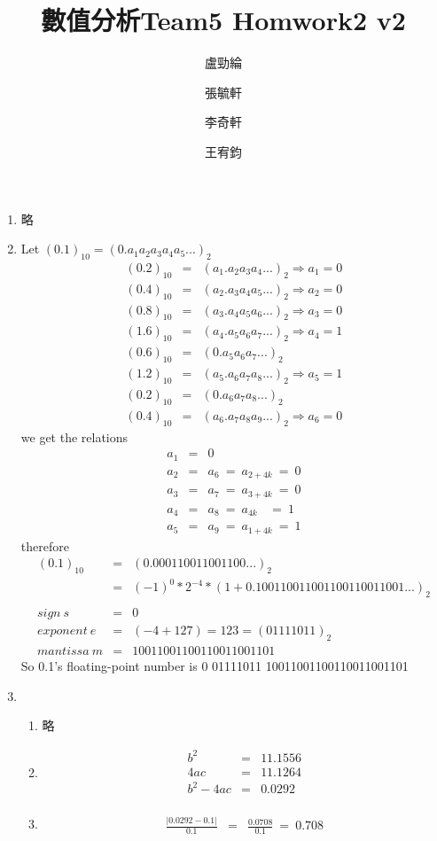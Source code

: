\documentclass[12pt]{article}
\title{數值分析Team5 Homwork2 v2}
\author{盧勁綸\and 張毓軒\and 李奇軒\and 王宥鈞}
\date{}
\begin{document}
\begin{enumerate}
\item 
略
\item 
Let $(0.1)_{10}=(0.a_1a_2a_3a_4a_5...)_{2}$ 
\begin{eqnarray*}
(0.2)_{10}&=&(a_1.a_2a_3a_4...)_2 \Rightarrow a_1=0\\
(0.4)_{10}&=&(a_2.a_3a_4a_5...)_2 \Rightarrow a_2=0\\
(0.8)_{10}&=&(a_3.a_4a_5a_6...)_2 \Rightarrow a_3=0\\
(1.6)_{10}&=&(a_4.a_5a_6a_7...)_2 \Rightarrow a_4=1\\
(0.6)_{10}&=&(0.a_5a_6a_7...)_2\\
(1.2)_{10}&=&(a_5.a_6a_7a_8...)_2 \Rightarrow a_5=1\\
(0.2)_{10}&=&(0.a_6a_7a_8...)_2\\
(0.4)_{10}&=&(a_6.a_7a_8a_9...)_2 \Rightarrow a_6=0
\end{eqnarray*}	
we get the relations
\begin{eqnarray*}
a_1&=&0\\
a_2&=&a_6\ =\ a_{2+4k}\ =\ 0\\
a_3&=&a_7\ =\ a_{3+4k}\ =\ 0\\
a_4&=&a_8\ =\ a_{4k}\ \ \ \ =\ 1\\
a_5&=&a_9\ =\ a_{1+4k}\ =\ 1
\end{eqnarray*}
therefore
\begin{eqnarray*}
(0.1)_{10}&=&(0.000110011001100...)_{2}\\
&=&(-1)^{0}*2^{-4}*(1+0.100110011001100110011001...)_2\\\\
sign\ s&=&0\\
exponent\ e&=&(-4+127)=123=(01111011)_{2}\\
mantissa\ m&=&10011001100110011001101 
\end{eqnarray*}
So 0.1's floating-point number is 0 01111011 10011001100110011001101


\item 
\begin{enumerate}

\item 
略\\

\item
\begin{eqnarray*}
b^2&=&11.1556\\
4ac&=&11.1264\\
b^2-4ac&=&0.0292\\
\end{eqnarray*}


\item
\begin{eqnarray*}
\frac{\left|0.0292-0.1\right|}{0.1}&=&\frac{0.0708}{0.1}
\ =\ 0.708
\end{eqnarray*}
\end{enumerate}
\end{enumerate}
\end{document}
